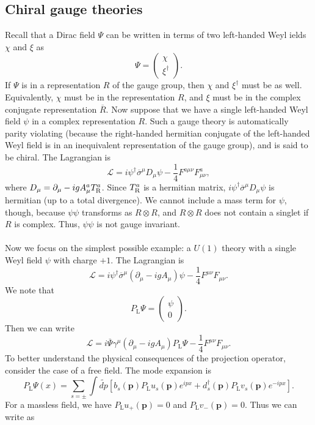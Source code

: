 \subsection{Chiral gauge theories}
Recall that a Dirac field $\Psi$ can be written in terms of two left-handed Weyl ields $\chi$ and $\xi$ as
\[\Psi = \begin{pmatrix}\chi\\ \xi^{\dagger} \end{pmatrix}.\] If $\Psi$ is in a representation $R$ of the gauge group, then $\chi$ and $\xi^{\dagger}$ must be as well. Equivalently, $\chi$ must be in the representation $R$, and $\xi$ must be in the complex conjugate representation $\overline{R}$.
Now suppose that we have a single left-handed Weyl field $\psi$ in a complex representation $R$. Such a gauge theory is automatically parity violating (because the right-handed hermitian conjugate of the left-handed Weyl field is in an inequivalent representation of the gauge group), and is said to be chiral.
The Lagrangian is
\[\mathcal{L} = i\psi^{\dagger} \overline{\sigma}^{\mu} D_{\mu} \psi - \frac{1}{4}F^{a\mu\nu}F^a_{\mu\nu},\]
where $D_{\mu} = \partial_{\mu} - igA^{a}_{\mu} T^a_{\rm R}$.
Since $T^a_{\rm R}$ is a hermitian matrix, $i\psi^{\dagger} \overline{\sigma}^{\mu} D_{\mu} \psi$ is hermitian (up to a total divergence). We cannot include a mass term for $\psi$, though, because $\psi\psi$ transforms as $R \otimes R$, and $R \otimes R$ does not contain a singlet if $R$ is complex. Thus, $\psi\psi$ is not gauge invariant. 
\\ \\
Now we focus on the simplest possible example: a $U(1)$ theory with a single Weyl field $\psi$ with charge $+1$. The Lagrangian is
\[\mathcal{L} = i\psi^{\dagger} \overline{\sigma}^{\mu} (\partial_{\mu} - igA_{\mu}) \psi - \frac{1}{4}F^{\mu\nu}F_{\mu\nu}.\]
We note that
\[P_{\mathrm{L}} \Psi = \begin{pmatrix}
\psi \\ 0
\end{pmatrix}.\]
Then we can write
\[\mathcal{L} = i\overline{\Psi} \gamma^{\mu} (\partial_{\mu} - igA_{\mu}) P_{\mathrm{L}}\Psi - \frac{1}{4}F^{\mu\nu}F_{\mu\nu}.\]
To better understand the physical consequences of the projection operator, consider the case of a free field. The mode expansion is
\[P_{\mathrm{L}}\Psi(x) = \sum_{s = \pm} \int \tilde{dp} [b_s(\bm{p})P_{\mathrm{L}}u_s(\bm{p})e^{ipx} + d_s^{\dagger}(\bm{p})P_{\mathrm{L}} v_s(\bm{p}) e^{-ipx}].\]
For a massless field, we have $P_{\mathrm{L}} u_{+}(\bm{p}) = 0$ and $P_{\mathrm{L}} v_-(\bm{p}) = 0$. Thus we can write as
